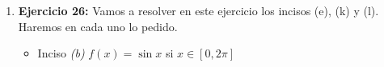 \documentclass[12pt]{article}
\theoremstyle{definition}
\begin{document}
\begin{enumerate}
\item \textbf{Ejercicio 26:} 
Vamos a resolver en este ejercicio los incisos (e), (k) y (l). Haremos en cada uno lo pedido.
\begin{itemize}
\item Inciso \textit{(b)} $f(x) = \sin x$ si $x \in [0, 2\pi]$

\begin{enumerate}


\end{enumerate}
\end{itemize}
\end{enumerate}
\end{document}
